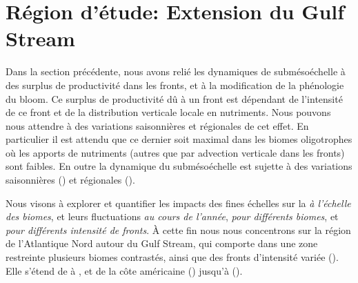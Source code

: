 \begin{figure}
  \centering
  \label{fig:early-bloom-mahadevan}
\end{figure}

\section{Région d'étude: Extension du Gulf Stream}
\label{sec:region-detude}

Dans la section précédente, nous avons relié les dynamiques de submésoéchelle à des surplus de productivité dans les fronts, et à la modification de la phénologie du bloom.
Ce surplus de productivité dû à un front est dépendant de l'intensité de ce front et de la distribution verticale locale en nutriments.
Nous pouvons nous attendre à des variations saisonnières et régionales de cet effet.
En particulier il est attendu que ce dernier soit maximal dans les biomes oligotrophes où les apports de nutriments (autres que par advection verticale dans les fronts) sont faibles.
En outre la dynamique du submésoéchelle est sujette à des variations saisonnières (\cite{callies_2015}) et régionales (\cite{mauzole_2022}).

Nous visons à explorer et quantifier les impacts des fines échelles sur la  \emph{à l'échelle des biomes}, et leurs fluctuations \emph{au cours de l'année}, \emph{pour différents biomes}, et \emph{pour différents intensité de fronts}.
À cette fin nous nous concentrons sur la région de l'Atlantique Nord autour du Gulf Stream, qui comporte dans une zone restreinte plusieurs biomes contrastés, ainsi que des fronts d'intensité variée (\cite{bock_2022}).
Elle s'étend de  à , et de la côte américaine () jusqu'à  ().

\begin{figure}
  \centering
  \label{fig:region}
\end{figure}

